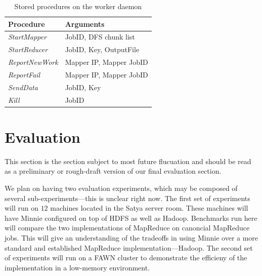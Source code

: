 \documentclass[10pt,letter,final,article,twocolumn]{article} %
\newcommand{\rpc}[1]{\emph{#1}}
\begin{document}
\begin{table}[htdp]
\caption{Stored procedures on the worker daemon}
\begin{center}
\begin{tabular}{|l|l|}\hline
\textbf{Procedure} & \textbf{Arguments}\\\hline
\rpc{StartMapper} & JobID, DFS chunk list \\
\rpc{StartReducer} & JobID, Key, OutputFile \\
\rpc{ReportNewWork} & Mapper IP, Mapper JobID\\
\rpc{ReportFail} & Mapper IP, Mapper JobID\\
\rpc{SendData} & JobID, Key\\
\rpc{Kill} & JobID\\\hline
\end{tabular}
\end{center}
\label{tab:worker_rpc}
\end{table}%



\section{Evaluation}
This section is the section subject to most future flucuation and should be
read as a preliminary or rough-draft version of our final evaluation section.

We plan on having two evaluation experiments, which may be composed of
several sub-experiments---this is unclear right now.  The first set of experiments
will run on $12$ machines located in the Satya server room.  These machines
will have Minnie configured on top of HDFS as well as Hadoop.  Benchmarks run
here will compare the two implementations of MapReduce on canoncial MapReduce
jobs.  This will give an understanding of the tradeoffs in using Minnie over a
more standard and established MapReduce implementation---Hadoop. The
second set of experiments will run on a FAWN cluster to demonstrate the
efficieny of the implementation in a low-memory environment.




\end{document}
